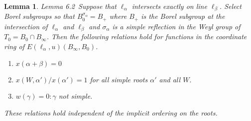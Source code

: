 \documentclass{memo-l}
\newtheorem{lemma}[theorem]{Lemma}
\theoremstyle{definition}
\theoremstyle{remark}
\numberwithin{section}{chapter}
\numberwithin{equation}{chapter}
\begin{document}
\begin{lemma}{Lemma 6.2}\ Suppose that ${\ell}_{{\alpha}}$ intersects
exactly on line ${\ell}_{{\beta}}$.  Select Borel subgroups so that
$B_{0}^{{\sigma}_{{\alpha}}} =  B_{+}$ where $B_{+}$ is the Borel
subgroup at the intersection of ${\ell}_{{\alpha}}$ and ${\ell}_{{\beta}}$
and ${\sigma}_{{\alpha}}$ is a simple reflection in the Weyl group of
$T_{0}  =  B_{0}  \cap  B_{{\infty}}$.  Then the following relations hold for
functions in the coordinate ring of
$E({\ell}_{{\alpha}},u)(B_{{\infty}},B_{0})$.

\begin{enumerate}[label=\alph*)]
\item $x({\alpha}+{\beta})  =  0$
\item $x(W,{\alpha}')/x({\alpha}')  =  1$ for all simple roots ${\alpha}'$ and
all $W$.
\item $w({\gamma})  =  0 : {\gamma}$ not simple.
\end{enumerate}
\noindent
These relations hold independent of the implicit ordering on the roots.
\end{lemma}
\end{document}
